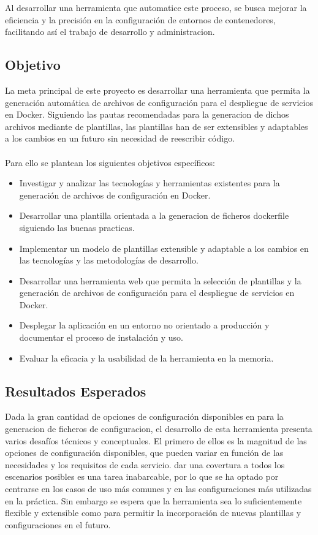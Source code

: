 \documentclass[12pt, a4paper, twoside]{article}
\begin{document}
Al desarrollar una herramienta que automatice este proceso, 
se busca mejorar la eficiencia y la precisión en la configuración de entornos de contenedores, facilitando así el trabajo de desarrollo y administracion. 

\subsection{Objetivo}
La meta principal de este proyecto es desarrollar una herramienta que permita la generación automática de archivos de configuración para el despliegue de servicios en Docker.
Siguiendo las pautas recomendadas para la generacion de dichos archivos mediante de plantillas, las plantillas han de ser extensibles y adaptables a los cambios en un futuro sin necesidad de reescribir código.
\\ \\
Para ello se plantean los siguientes objetivos específicos:
\begin{itemize}
	\item Investigar y analizar las tecnologías y herramientas existentes para la generación de archivos de configuración en Docker.
	\item Desarrollar una plantilla orientada a la generacion de ficheros dockerfile siguiendo las buenas practicas.
	\item Implementar un modelo de plantillas extensible y adaptable a los cambios en las tecnologías y las metodologías de desarrollo.
	\item Desarrollar una herramienta web que permita la selección de plantillas y la generación de archivos de configuración para el despliegue de servicios en Docker.
	\item Desplegar la aplicación en un entorno no orientado a producción y documentar el proceso de instalación y uso.
	\item Evaluar la eficacia y la usabilidad de la herramienta en la memoria.
\end{itemize}

\newpage 
\subsection{Resultados Esperados}
Dada la gran cantidad de opciones de configuración disponibles en para la generacion de ficheros de configuracion, el desarrollo de esta herramienta presenta varios desafíos técnicos y conceptuales.
El primero de ellos es la magnitud de las opciones de configuración disponibles, que pueden variar en función de las necesidades y los requisitos de cada servicio.
dar una covertura a todos los escenarios posibles es una tarea inabarcable, por lo que se ha optado por centrarse en los casos de uso más comunes y en las configuraciones más utilizadas en la práctica.
Sin embargo se espera que la herramienta sea lo suficientemente flexible y extensible como para permitir la incorporación de nuevas plantillas y configuraciones en el futuro.
\end{document}
